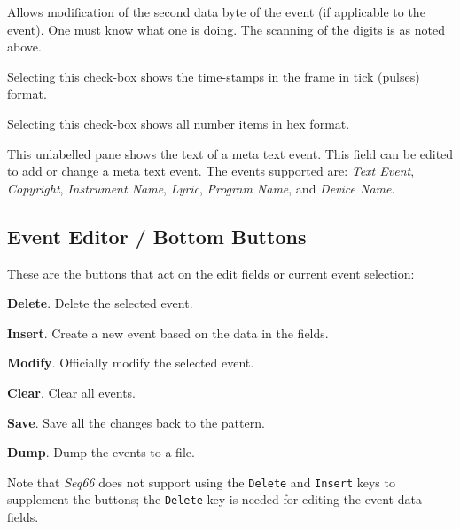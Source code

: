    Allows modification of the second data byte of the event (if applicable
   to the event).
   One must know what one is doing.
   The scanning of the digits is as noted above.

   Selecting this check-box
   shows the time-stamps in the frame in tick (pulses) format.

   Selecting this check-box
   shows all number items in hex format.

   This unlabelled pane shows the text of a meta text event.
   This field can be edited to add or change a meta text event.
   The events supported are:
   \textsl{Text Event},
   \textsl{Copyright},
   \textsl{Instrument Name},
   \textsl{Lyric},
   \textsl{Program Name}, and
   \textsl{Device Name}.


\subsection{Event Editor / Bottom Buttons}
\label{subsec:event_editor_buttons}

   These are the buttons that act on the edit fields or current event
   selection:

   \begin{enumber}
      \item \textbf{Delete}.
         Delete the selected event.
      \item \textbf{Insert}.
         Create a new event based on the data in the fields.
      \item \textbf{Modify}.
         Officially modify the selected event.
      \item \textbf{Clear}.
         Clear all events.
      \item \textbf{Save}.
         Save all the changes back to the pattern.
      \item \textbf{Dump}.
         Dump the events to a file.
   \end{enumber}

   Note that
   \textsl{Seq66} does not support using the
   \texttt{Delete} and \texttt{Insert} keys to
   supplement the buttons; the \texttt{Delete}
   key is needed for editing the event data fields.

